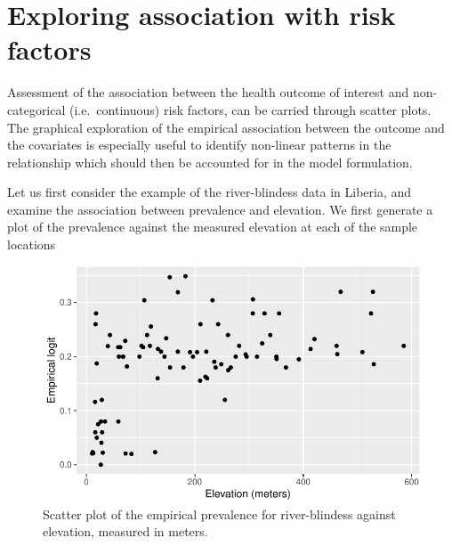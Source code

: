 \documentclass[
  letterpaper,
]{krantz}
\newenvironment{Shaded}{\begin{snugshade}}{\end{snugshade}}
\newcommand{\AttributeTok}[1]{\textcolor[rgb]{0.40,0.45,0.13}{#1}}
\newcommand{\FunctionTok}[1]{\textcolor[rgb]{0.28,0.35,0.67}{#1}}
\newcommand{\NormalTok}[1]{\textcolor[rgb]{0.00,0.23,0.31}{#1}}
\newcommand{\OtherTok}[1]{\textcolor[rgb]{0.00,0.23,0.31}{#1}}
\newcommand{\SpecialCharTok}[1]{\textcolor[rgb]{0.37,0.37,0.37}{#1}}
\newcommand{\StringTok}[1]{\textcolor[rgb]{0.13,0.47,0.30}{#1}}
\begin{document}
\hypertarget{exploring-association-with-risk-factors}{%
\section{Exploring association with risk
factors}\label{exploring-association-with-risk-factors}}

Assessment of the association between the health outcome of interest and
non-categorical (i.e.~continuous) risk factors, can be carried through
scatter plots. The graphical exploration of the empirical association
between the outcome and the covariates is especially useful to identify
non-linear patterns in the relationship which should then be accounted
for in the model formulation.

Let us first consider the example of the river-blindess data in Liberia,
and examine the association between prevalence and elevation. We first
generate a plot of the prevalence against the measured elevation at each
of the sample locations

\begin{Shaded}
\end{Shaded}

\begin{figure}[H]

{\centering \includegraphics{03_model-fitting_files/figure-pdf/fig-prev-elev-liberia-1.pdf}

}

\caption{\label{fig-prev-elev-liberia}Scatter plot of the empirical
prevalence for river-blindess against elevation, measured in meters.}

\end{figure}
\end{document}

